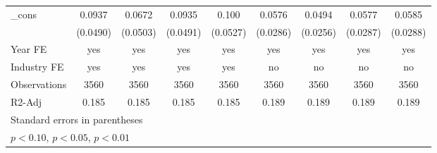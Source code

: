 \begin{table}[htbp]
\begin{tabular}{l*{8}{c}}
\_cons              &      0.0937\sym{*}  &      0.0672         &      0.0935\sym{*}  &       0.100\sym{*}  &      0.0576\sym{**} &      0.0494\sym{*}  &      0.0577\sym{**} &      0.0585\sym{**} \\
                    &    (0.0490)         &    (0.0503)         &    (0.0491)         &    (0.0527)         &    (0.0286)         &    (0.0256)         &    (0.0287)         &    (0.0288)         \\
\hline
Year FE             &         yes         &         yes         &         yes         &         yes         &         yes         &         yes         &         yes         &         yes         \\
Industry FE         &         yes         &         yes         &         yes         &         yes         &          no         &          no         &          no         &          no         \\
Observations        &        3560         &        3560         &        3560         &        3560         &        3560         &        3560         &        3560         &        3560         \\
R2-Adj              &       0.185         &       0.185         &       0.185         &       0.185         &       0.189         &       0.189         &       0.189         &       0.189         \\
\hline\hline
\multicolumn{9}{l}{\footnotesize Standard errors in parentheses}\\
\multicolumn{9}{l}{\footnotesize \sym{*} \(p<0.10\), \sym{**} \(p<0.05\), \sym{***} \(p<0.01\)}\\
\end{tabular}
\end{table}
